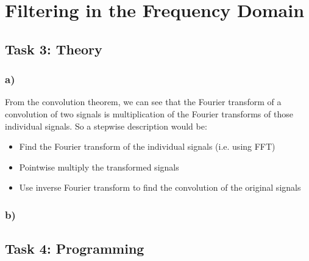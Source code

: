 \section{Filtering in the Frequency Domain}
\subsection{Task 3: Theory}
\subsubsection*{a)}
From the convolution theorem, we can see that the Fourier transform of a convolution of two signals is multiplication of the Fourier transforms of those individual signals. So a stepwise description would be: 
\begin{itemize}
    \item Find the Fourier transform of the individual signals (i.e. using FFT)
    \item Pointwise multiply the transformed signals
    \item Use inverse Fourier transform to find the convolution of the original signals
\end{itemize}

\subsubsection*{b)}


\newpage
\subsection{Task 4: Programming}
